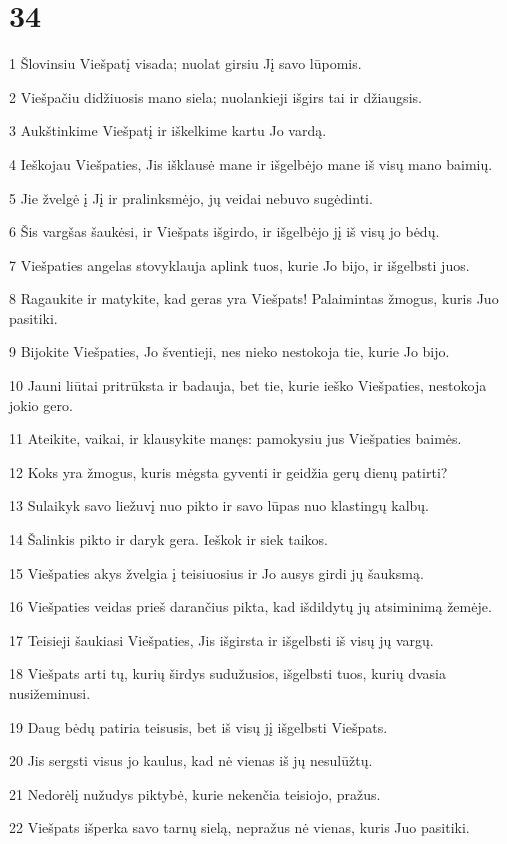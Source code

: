 \chapter{34}


\par 1 Šlovinsiu Viešpatį visada; nuolat girsiu Jį savo lūpomis. 
\par 2 Viešpačiu didžiuosis mano siela; nuolankieji išgirs tai ir džiaugsis. 
\par 3 Aukštinkime Viešpatį ir iškelkime kartu Jo vardą. 
\par 4 Ieškojau Viešpaties, Jis išklausė mane ir išgelbėjo mane iš visų mano baimių. 
\par 5 Jie žvelgė į Jį ir pralinksmėjo, jų veidai nebuvo sugėdinti. 
\par 6 Šis vargšas šaukėsi, ir Viešpats išgirdo, ir išgelbėjo jį iš visų jo bėdų. 
\par 7 Viešpaties angelas stovyklauja aplink tuos, kurie Jo bijo, ir išgelbsti juos. 
\par 8 Ragaukite ir matykite, kad geras yra Viešpats! Palaimintas žmogus, kuris Juo pasitiki. 
\par 9 Bijokite Viešpaties, Jo šventieji, nes nieko nestokoja tie, kurie Jo bijo. 
\par 10 Jauni liūtai pritrūksta ir badauja, bet tie, kurie ieško Viešpaties, nestokoja jokio gero. 
\par 11 Ateikite, vaikai, ir klausykite manęs: pamokysiu jus Viešpaties baimės. 
\par 12 Koks yra žmogus, kuris mėgsta gyventi ir geidžia gerų dienų patirti? 
\par 13 Sulaikyk savo liežuvį nuo pikto ir savo lūpas nuo klastingų kalbų. 
\par 14 Šalinkis pikto ir daryk gera. Ieškok ir siek taikos. 
\par 15 Viešpaties akys žvelgia į teisiuosius ir Jo ausys girdi jų šauksmą. 
\par 16 Viešpaties veidas prieš darančius pikta, kad išdildytų jų atsiminimą žemėje. 
\par 17 Teisieji šaukiasi Viešpaties, Jis išgirsta ir išgelbsti iš visų jų vargų. 
\par 18 Viešpats arti tų, kurių širdys sudužusios, išgelbsti tuos, kurių dvasia nusižeminusi. 
\par 19 Daug bėdų patiria teisusis, bet iš visų jį išgelbsti Viešpats. 
\par 20 Jis sergsti visus jo kaulus, kad nė vienas iš jų nesulūžtų. 
\par 21 Nedorėlį nužudys piktybė, kurie nekenčia teisiojo, pražus. 
\par 22 Viešpats išperka savo tarnų sielą, nepražus nė vienas, kuris Juo pasitiki.



